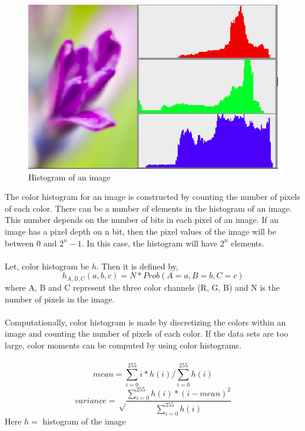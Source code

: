 \documentclass[pstricks,10pt]{report}
\begin{document}
\begin{figure}[!h]
\centering
        \includegraphics[width=.8\linewidth]{hist_example.png}
    \caption{Histogram of an image}
    \label{fig:verticalcell}
\end{figure}
The color histogram for an image is constructed by counting the number of pixels of each color. There can be a number of elements in the histogram of an image. This number depends on the number of bits in each pixel of an image. If an image has a pixel depth on n bit, then the pixel values of the image will be between $0$  and $2^n-1$. In this case, the histogram will have $2^{n}$ elements.\\
\\
Let, color histogram be $h$. Then it is defined by,\\
\begin{equation}
h_{A,B,C}(a,b,c)=N*Prob(A=a,B=b,C=c)\label{eq:4}
\end{equation}
where A, B and C represent the three color channels (R, G, B) and N is the number of pixels in the image.\\
\\
Computationally, color histogram is made by discretizing the colors within an image and counting the number of pixels of each color. If the data sets are too large, color moments can be computed  by using color histograms.\\
\\ 
\begin{equation}
mean=\sum_{i=0}^{255}i*h(i)/\sum_{i=0}^{255}h(i)\label{eq:5}
\end{equation}
\begin{equation}
variance=\sqrt \frac{\displaystyle \sum_{i=0}^{255}h(i)*(i-mean)^2}{\displaystyle\sum_{i=0}^{255}h(i)}\label{eq:6}
\end{equation}
Here $h=$ histogram of the image\\
\end{document}
